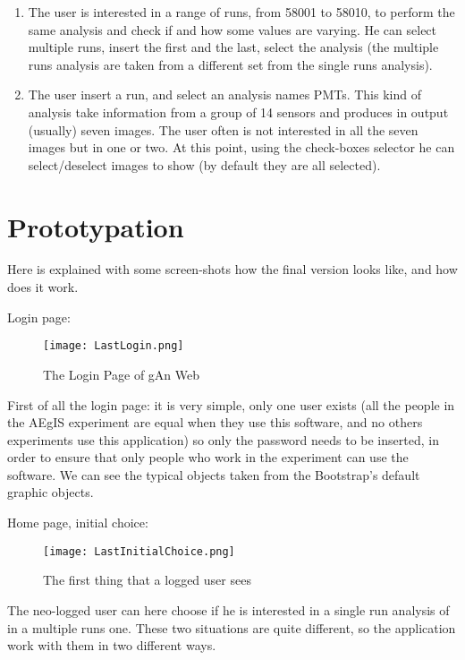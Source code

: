 \begin{enumerate}
\item
The user is interested in a range of runs, from 58001 to 58010, to perform the same analysis and check if and how some values are varying. He can select multiple runs, insert the first and the last, select the analysis (the multiple runs analysis are taken from a different set from the single runs analysis).

\item
The user insert a run, and select an analysis names PMTs. This kind of analysis take information from a group of 14 sensors and produces in output (usually) seven images. The user often is not interested in all the seven images but in one or two. At this point, using the check-boxes selector he can select/deselect images to show (by default they are all selected).  

\end{enumerate}

\section{Prototypation}

Here is explained with some screen-shots how the final version looks like, and how does it work.

Login page:


\begin{figure}[H]
\centering
\texttt{[image: LastLogin.png]} 
\caption{The Login Page of gAn Web}
\end{figure}

First of all the login page: it is very simple, only one user exists (all the people in the AEgIS experiment are equal when they use this software, and no others experiments use this application) so only the password needs to be inserted, in order to ensure that only people who work in the experiment can use the software. We can see the typical objects taken from the Bootstrap's default graphic objects.


Home page, initial choice:

\begin{figure}[H]
\centering
\texttt{[image: LastInitialChoice.png]} 
\caption{The first thing that a logged user sees}
\end{figure}
  
The neo-logged user can here choose if he is interested in a single run analysis of in a multiple runs one. These two situations are quite different, so the application work with them in two different ways.


